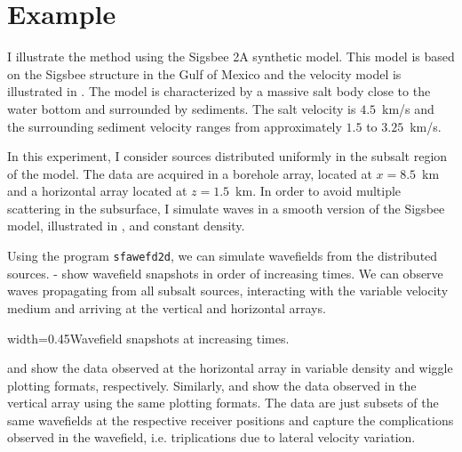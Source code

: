 \section{Example}


I illustrate the method using the Sigsbee 2A synthetic model.  This
model is based on the Sigsbee structure in the Gulf of Mexico and the
velocity model is illustrated in . The model is
characterized by a massive salt body close to the water bottom and
surrounded by sediments. The salt velocity is $4.5$~km/s and the
surrounding sediment velocity ranges from approximately $1.5$ to
$3.25$~km/s.


In this experiment, I consider sources distributed uniformly in the
subsalt region of the model. The data are acquired in a borehole
array, located at $x=8.5$~km and a horizontal array located at
$z=1.5$~km. In order to avoid multiple scattering in the subsurface, I
simulate waves in a smooth version of the Sigsbee model, illustrated in
, and constant density.


Using the \mg program \texttt{sfawefd2d}, we can simulate wavefields
from the distributed sources. - show
wavefield snapshots in order of increasing times. We can observe waves
propagating from all subsalt sources, interacting with the variable
velocity medium and arriving at the vertical and horizontal arrays.

{width=0.45\textwidth}{Wavefield snapshots at increasing times.}

 and  show the data observed at the horizontal
array in variable density and wiggle plotting formats,
respectively. Similarly,  and  show the data
observed in the vertical array using the same plotting formats. The
data are just subsets of the same wavefields at the respective
receiver positions and capture the complications observed in the
wavefield, i.e. triplications due to lateral velocity variation.


